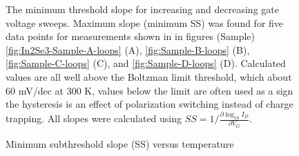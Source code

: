 \begin{figure}
\begin{centering}
{}
\par\end{centering}
\caption{Minimum subthreshold slope (SS) versus temperature\label{fig:Min-subthreshold-slope-vs-T}}

The minimum threshold slope for increasing and decreasing gate voltage
sweeps. Maximum slope (minimum SS) was found for five data points
for measurements shown in in figures (Sample) \ref{fig:In2Se3-Sample-A-loops}
(A), \ref{fig:Sample-B-loops} (B), \ref{fig:Sample-C-loops} (C),
and \ref{fig:Sample-D-loops} (D). Calculated values are all well
above the Boltzman limit threshold\citep{beckers2018cryogenic}, which
about 60 mV/dec at 300 K, values below the limit are often used as
a sign the hysteresis is an effect of polarization switching instead
of charge trapping\citep{jin2019onthe,jin2020physical}. All slopes
were calculated using $SS=1/\frac{\partial\log_{10}I_{D}}{\partial V_{G}}$.
\end{figure}

